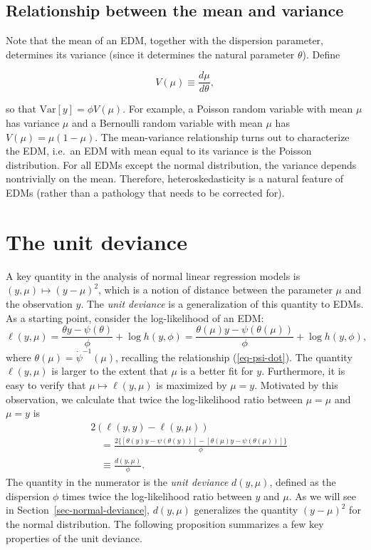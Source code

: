 \documentclass[
  11pt,
  letterpaper,
  oneside]{book}
\theoremstyle{plain}
\theoremstyle{definition}
\theoremstyle{definition}
\theoremstyle{plain}
\theoremstyle{plain}
\theoremstyle{remark}
\begin{document}
\hypertarget{relationship-between-the-mean-and-variance}{%
\subsection{Relationship between the mean and
variance}\label{relationship-between-the-mean-and-variance}}

Note that the mean of an EDM, together with the dispersion parameter,
determines its variance (since it determines the natural parameter
\(\theta\)). Define

\[
V(\mu) \equiv \frac{d\mu}{d\theta},
\]

so that \(\text{Var}[y] = \phi V(\mu)\). For example, a Poisson random
variable with mean \(\mu\) has variance \(\mu\) and a Bernoulli random
variable with mean \(\mu\) has \(V(\mu) = \mu(1-\mu)\). The
mean-variance relationship turns out to characterize the EDM, i.e.~an
EDM with mean equal to its variance is the Poisson distribution. For all
EDMs except the normal distribution, the variance depends nontrivially
on the mean. Therefore, heteroskedasticity is a natural feature of EDMs
(rather than a pathology that needs to be corrected for).

\hypertarget{the-unit-deviance}{%
\section{The unit deviance}\label{the-unit-deviance}}

A key quantity in the analysis of normal linear regression models is
\((y, \mu) \mapsto (y - \mu)^2\), which is a notion of distance between
the parameter \(\mu\) and the observation \(y\). The \emph{unit
deviance} is a generalization of this quantity to EDMs. As a starting
point, consider the log-likelihood of an EDM: \[
\ell(y, \mu) = \frac{\theta y - \psi(\theta)}{\phi} + \log h(y, \phi) = \frac{\theta(\mu) y - \psi(\theta(\mu))}{\phi} + \log h(y, \phi),
\] where \(\theta(\mu) = \dot \psi^{-1}(\mu)\), recalling the
relationship (\ref{eq-psi-dot}). The quantity \(\ell(y, \mu)\) is larger
to the extent that \(\mu\) is a better fit for \(y\). Furthermore, it is
easy to verify that \(\mu \mapsto \ell(y, \mu)\) is maximized by
\(\mu = y\). Motivated by this observation, we calculate that twice the
log-likelihood ratio between \(\mu = \mu\) and \(\mu = y\) is \[
\begin{split}
&2(\ell(y, y) - \ell(y, \mu)) \\
&\quad= \frac{2\{[\theta(y) y - \psi(\theta(y))] - [\theta(\mu) y - \psi(\theta(\mu))]\}}{\phi} \\
&\quad\equiv \frac{d(y, \mu)}{\phi}.
\end{split}
\] The quantity in the numerator is the \emph{unit deviance}
\(d(y, \mu)\), defined as the dispersion \(\phi\) times twice the
log-likelihood ratio between \(y\) and \(\mu\). As we will see in
Section~\ref{sec-normal-deviance}, \(d(y, \mu)\) generalizes the
quantity \((y - \mu)^2\) for the normal distribution. The following
proposition summarizes a few key properties of the unit deviance.
\end{document}

